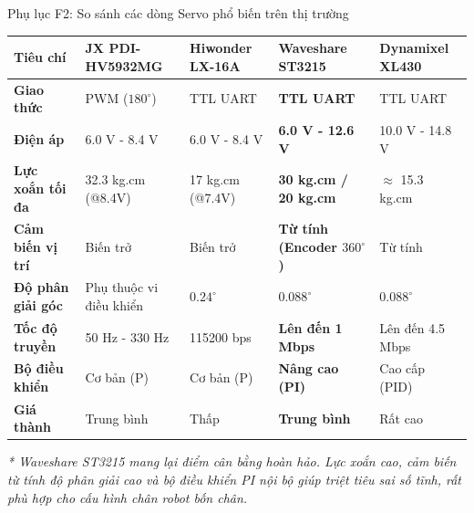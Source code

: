 \documentclass[10pt,aspectratio=169]{beamer}
\begin{document}
\begin{frame}{Phụ lục F2: So sánh các dòng Servo phổ biến trên thị trường}
  \begin{table}[htbp]
      \centering
      \scriptsize
      \def\arraystretch{1.3}
      \begin{tabular}{p{1.8cm} p{2.2cm} p{2.2cm} p{3cm} p{2.5cm}}
          \toprule
          \textbf{Tiêu chí} & \textbf{JX PDI-HV5932MG} & \textbf{Hiwonder LX-16A} & \textbf{\textcolor{hcmutred}{Waveshare ST3215}} & \textbf{Dynamixel XL430} \\
          \midrule
          \textbf{Giao thức} & PWM ($180^\circ$) & TTL UART & \textbf{TTL UART} & TTL UART \\
          \textbf{Điện áp} & 6.0 V - 8.4 V & 6.0 V - 8.4 V & \textbf{6.0 V - 12.6 V} & 10.0 V - 14.8 V \\
          \textbf{Lực xoắn tối đa} & 32.3 kg.cm (@8.4V) & 17 kg.cm (@7.4V) & \textbf{30 kg.cm / 20 kg.cm} & $\approx$ 15.3 kg.cm \\
          \textbf{Cảm biến vị trí} & Biến trở & Biến trở & \textbf{Từ tính (Encoder $360^\circ$)} & Từ tính \\
          \textbf{Độ phân giải góc} & Phụ thuộc vi điều khiển & $0.24^\circ$ & \textbf{$0.088^\circ$} & $0.088^\circ$ \\
          \textbf{Tốc độ truyền} & 50 Hz - 330 Hz & 115200 bps & \textbf{Lên đến 1 Mbps} & Lên đến 4.5 Mbps \\
          \textbf{Bộ điều khiển} & Cơ bản (P) & Cơ bản (P) & \textbf{Nâng cao (PI)} & Cao cấp (PID) \\
          \textbf{Giá thành} & Trung bình & Thấp & \textbf{Trung bình} & Rất cao \\
          \bottomrule
      \end{tabular}
  \end{table}
  \vspace{0.1cm}
  {\small \textit{* Waveshare ST3215 mang lại điểm cân bằng hoàn hảo. Lực xoắn cao, cảm biến từ tính độ phân giải cao và bộ điều khiển PI nội bộ giúp triệt tiêu sai số tĩnh, rất phù hợp cho cấu hình chân robot bốn chân.}}
\end{frame}
\end{document}
